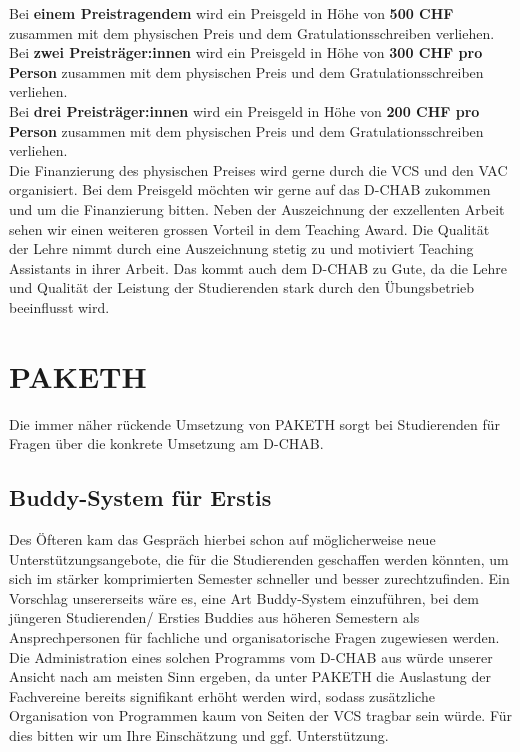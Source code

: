 \documentclass{article}
\begin{document}
Bei \textbf{einem Preistragendem} wird ein Preisgeld in Höhe von \textbf{500 CHF} zusammen mit dem physischen Preis und dem Gratulationsschreiben verliehen.\\

Bei \textbf{zwei Preisträger:innen} wird ein Preisgeld in Höhe von \textbf{300 CHF pro Person} zusammen mit dem physischen Preis und dem Gratulationsschreiben verliehen.\\

Bei \textbf{drei Preisträger:innen} wird ein Preisgeld in Höhe von \textbf{200 CHF pro Person} zusammen mit dem physischen Preis und dem Gratulationsschreiben verliehen.\\

Die Finanzierung des physischen Preises wird gerne durch die VCS und den VAC organisiert. Bei dem Preisgeld möchten wir gerne auf das D-CHAB zukommen und um die Finanzierung bitten. Neben der Auszeichnung der exzellenten Arbeit sehen wir einen weiteren grossen Vorteil in dem Teaching Award. Die Qualität der Lehre nimmt durch eine Auszeichnung stetig zu und motiviert Teaching Assistants in ihrer Arbeit. Das kommt auch dem D-CHAB zu Gute, da die Lehre und Qualität der Leistung der Studierenden stark durch den Übungsbetrieb beeinflusst wird.

\section{PAKETH}
Die immer näher rückende Umsetzung von PAKETH sorgt bei Studierenden für Fragen über die konkrete Umsetzung am D-CHAB.

\subsection{Buddy-System für Erstis}
Des Öfteren kam das Gespräch hierbei schon auf möglicherweise neue Unterstützungsangebote, die für die Studierenden geschaffen werden könnten, um sich im stärker komprimierten Semester schneller und besser zurechtzufinden. Ein Vorschlag unsererseits wäre es, eine Art Buddy-System einzuführen, bei dem jüngeren Studierenden/ Ersties Buddies aus höheren Semestern als Ansprechpersonen für fachliche und organisatorische Fragen zugewiesen werden.\\
Die Administration eines solchen Programms vom D-CHAB aus würde unserer Ansicht nach am meisten Sinn ergeben, da unter PAKETH die Auslastung der Fachvereine bereits signifikant erhöht werden wird, sodass zusätzliche Organisation von Programmen kaum von Seiten der VCS tragbar sein würde. Für dies bitten wir um Ihre Einschätzung und ggf. Unterstützung.
\end{document}
